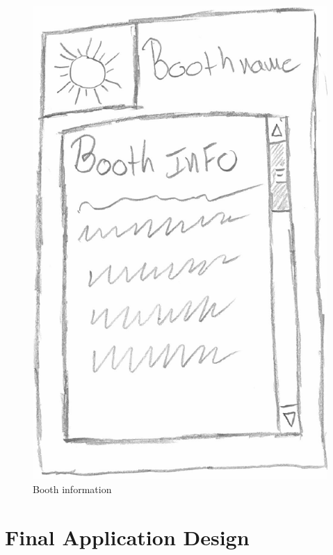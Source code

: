 \begin{figure}[H]
\begin{minipage}[b]{0.5\columnwidth}
\includegraphics[width=0.7\columnwidth]{img/prototype/8.png}
\caption{Booth information\label{fig:booth}}
\end{minipage}
\end{figure}

\pagebreak
\section{Final Application Design}

